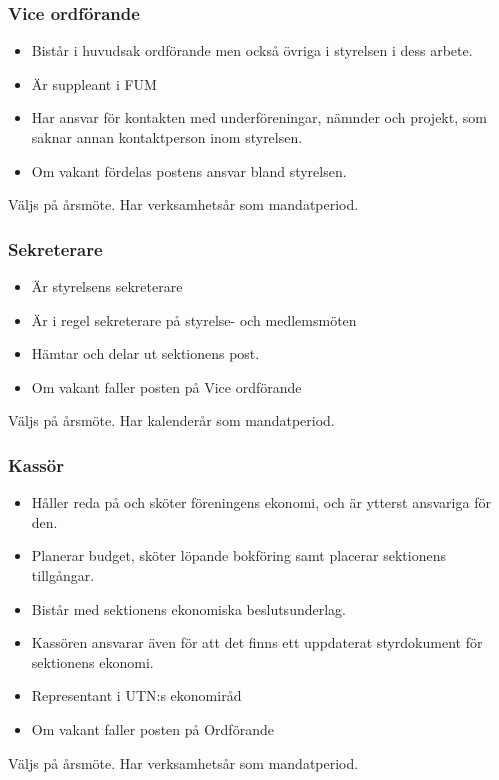 \documentclass{../resources/dgovdoc}
\begin{document}
\subsubsection{Vice ordförande} 

\begin{itemize}
\item Bistår i huvudsak ordförande men också övriga i styrelsen i dess arbete.
\item Är suppleant i FUM
\item Har ansvar för kontakten med underföreningar, nämnder och projekt, som saknar annan kontaktperson inom styrelsen.
\item Om vakant fördelas postens ansvar bland styrelsen.
\end{itemize}
Väljs på årsmöte. Har verksamhetsår som mandatperiod. 

\subsubsection{Sekreterare}

\begin{itemize}
\item Är styrelsens sekreterare
\item Är i regel sekreterare på styrelse- och medlemsmöten
\item Hämtar och delar ut sektionens post.
\item Om vakant faller posten på Vice ordförande
\end{itemize}
Väljs på årsmöte. Har kalenderår som mandatperiod. 

\subsubsection{Kassör}

\begin{itemize}
\item Håller reda på och sköter föreningens ekonomi, och är ytterst ansvariga för den. 
\item Planerar budget, sköter löpande bokföring samt placerar sektionens tillgångar. 
\item Bistår med sektionens ekonomiska beslutsunderlag. 
\item Kassören ansvarar även för att det finns ett uppdaterat styrdokument för sektionens ekonomi. 
\item Representant i UTN:s ekonomiråd
\item Om vakant faller posten på Ordförande
\end{itemize}
Väljs på årsmöte. Har verksamhetsår som mandatperiod. 
\end{document}
